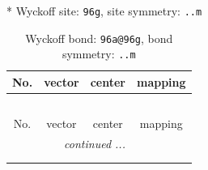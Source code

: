 \documentclass[fleqn,8pt]{jsarticle}
\begin{document}
* Wyckoff site: {\tt 96g}, site symmetry: {\tt ..m}
\renewcommand{\arraystretch}{1.2}
\begin{longtable}{cccc}
\caption{Wyckoff bond: {\tt 96a@96g}, bond symmetry: {\tt ..m}}
 \\
 \hline \hline
No. & vector & center & mapping \\ \hline \endfirsthead

\multicolumn{3}{l}{\tablename\ \thetable{}} \\
 \hline \hline
No. & vector & center & mapping \\ \hline \endhead

 \hline \hline
\multicolumn{3}{r}{\footnotesize\it continued ...} \\ \endfoot

 \hline \hline
\multicolumn{3}{r}{} \\ \endlastfoot


\end{longtable}
\end{document}
